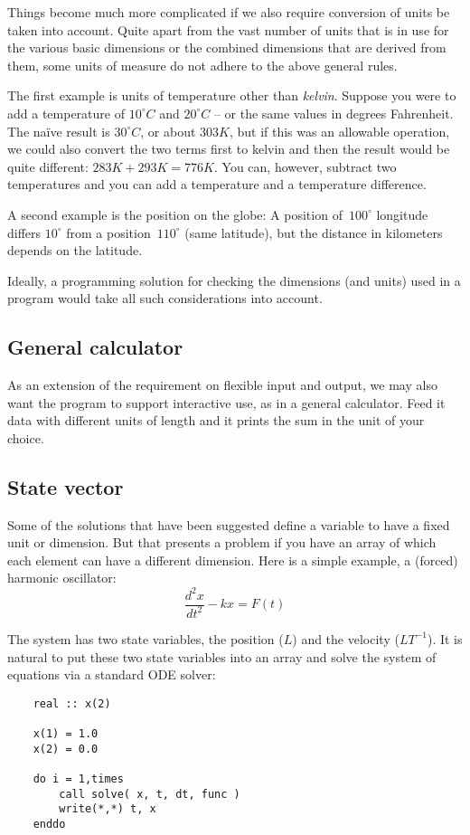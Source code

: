 \documentclass{article}
\begin{document}
Things become much more complicated if we also require conversion of units be taken into account. Quite apart from
the vast number of units that is in use for the various basic dimensions or the combined dimensions that are derived
from them, some units of measure do not adhere to the above general rules.

The first example is units of temperature other than \emph{kelvin}. Suppose you were to add a temperature of $10 ^\circ C$
and $20 ^\circ C$ -- or the same values in degrees Fahrenheit. The na\"ive result is $30 ^\circ C$, or about $303 K$, but if this was an
allowable operation, we could also convert the two terms first to kelvin and then the result would be quite different:
$ 283 K + 293 K = 776 K$. You can, however, subtract two temperatures and you can add a temperature and a temperature difference.

A second example is the position on the globe: A position of~$100^\circ$ longitude differs $10^\circ$ from a position~$110^\circ$
(same latitude), but the distance in kilometers depends on the latitude.

Ideally, a programming solution for checking the dimensions (and units) used in a program would take all such considerations
into account.

\subsection*{General calculator}

As an extension of the requirement on flexible input and output, we may also want the program to support interactive use,
as in a general calculator. Feed it data with different units of length and it prints the sum in the unit of your choice.

\subsection*{State vector}
Some of the solutions that have been suggested define a variable to have a fixed unit or dimension. But that presents
a problem if you have an array of which each element can have a different dimension. Here is a simple example,
a (forced) harmonic oscillator:
\begin{equation}
    \frac{d^2 x}{dt^2} - kx = F(t)
\end{equation}

The system has two state variables, the position ($L$) and the velocity ($L T^{-1}$). It is natural to put these two
state variables into an array and solve the system of equations via a standard ODE solver:
\begin{verbatim}
    real :: x(2)

    x(1) = 1.0
    x(2) = 0.0

    do i = 1,times
        call solve( x, t, dt, func )
        write(*,*) t, x
    enddo
\end{verbatim}
\end{document}
